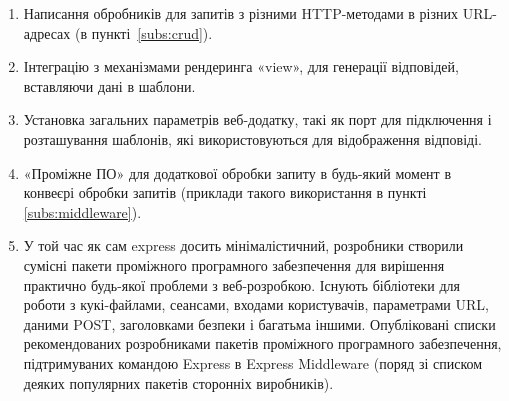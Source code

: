 \begin{enumerate}
	\item Написання обробників для запитів з різними HTTP-методами в різних URL-адресах (в пункті~\ref{subs:crud}).
	\item Інтеграцію з механізмами рендеринга «view», для генерації відповідей, вставляючи дані в шаблони.
	\item Установка загальних параметрів веб-додатку, такі як порт для підключення і розташування шаблонів, які використовуються для відображення відповіді.
	\item «Проміжне ПО» для додаткової обробки запиту в будь-який момент в конвеєрі обробки запитів (приклади такого використання в пункті \ref{subs:middleware}).
	\item У той час як сам express досить мінімалістичний, розробники створили сумісні пакети проміжного програмного забезпечення для вирішення практично будь-якої проблеми з веб-розробкою. Існують бібліотеки для роботи з кукі-файлами, сеансами, входами користувачів, параметрами URL, даними POST, заголовками безпеки і багатьма іншими. Опубліковані списки рекомендованих розробниками пакетів проміжного програмного забезпечення, підтримуваних командою Express в Express Middleware (поряд зі списком деяких популярних пакетів сторонніх виробників).
\end{enumerate}

